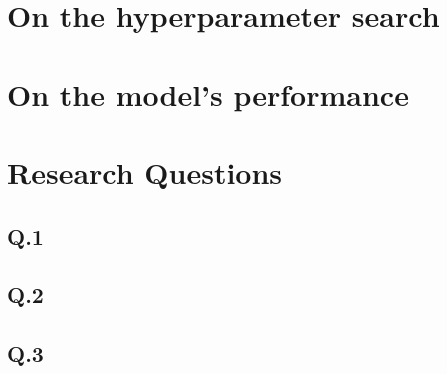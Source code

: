 \section{On the hyperparameter search} \label{sec:hyperparam}

\section{On the model's performance} \label{sec:modelperf}

\section{Research Questions} \label{sec:research_answer}

\subsection{Q.1}



\subsection{Q.2}



\subsection{Q.3}


